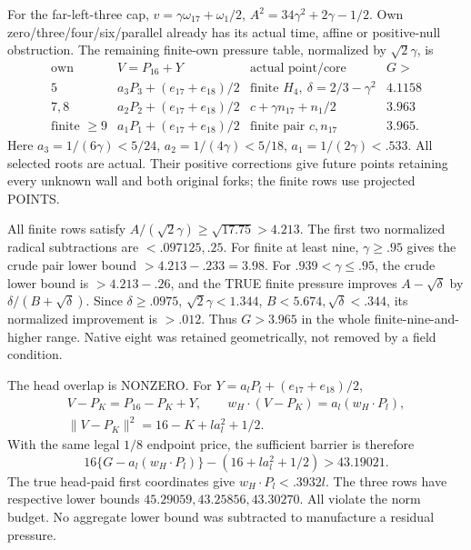\documentclass[11pt]{article}
\theoremstyle{definition}
\theoremstyle{remark}
\begin{document}
For the far-left-three cap,
\(v=\gamma\omega_{17}+\omega_1/2\),
\(A^2=34\gamma^2+2\gamma-1/2\).
Own zero/three/four/six/parallel
already has its actual time,
affine or positive-null
obstruction.
The remaining finite-own
pressure table, normalized by
\(\sqrt2\gamma\), is
\[
\begin{array}{c|c|c|c}
 \text{own}&V=P_{16}+Y&
        \text{actual point/core}&G>\\ \hline
 5&a_3P_3+(e_{17}+e_{18})/2&
       \text{finite }H_4,\ \delta=2/3-\gamma^2&4.1158\\
 7,8&a_2P_2+(e_{17}+e_{18})/2&
       c+\gamma n_{17}+n_1/2&3.963\\
 \text{finite }\ge9&a_1P_1+(e_{17}+e_{18})/2&
       \text{finite pair }c,n_{17}&3.965 .
\end{array}
\]
Here
\(a_3=1/(6\gamma)<5/24\),
\(a_2=1/(4\gamma)<5/18\),
\(a_1=1/(2\gamma)<.533\).
All selected roots are actual.
Their positive corrections give
future points retaining every
unknown wall and both original
forks; the finite rows use
projected POINTS.

All finite rows satisfy
\(A/(\sqrt2\gamma)\ge\sqrt{17.75}>4.213\).
The first two normalized radical
subtractions are \(<.097125,.25\).
For finite at least nine,
\(\gamma\ge.95\) gives the crude
pair lower bound
\(>4.213-.233=3.98\).
For \(.939<\gamma\le.95\),
the crude lower bound is
\(>4.213-.26\), and the TRUE
finite pressure improves
\(A-\sqrt\delta\) by
\(\delta/(B+\sqrt\delta)\).
Since
\(\delta\ge.0975\),
\(\sqrt2\gamma<1.344\),
\(B<5.674,\sqrt\delta<.344\),
its normalized improvement is
\(>.012\).
Thus \(G>3.965\) in the whole
finite-nine-and-higher range.
Native eight was retained
geometrically, not removed by
a field condition.

The head overlap is NONZERO.
For \(Y=a_lP_l+(e_{17}+e_{18})/2\),
\[
 \begin{gathered}
 V-P_K=P_{16}-P_K+Y,\qquad
 w_H\cdot(V-P_K)=a_l(w_H\cdot P_l),\\
       \|V-P_K\|^2=16-K+l a_l^2+1/2 .
 \end{gathered}
\]
With the same legal \(1/8\)
endpoint price, the sufficient
barrier is therefore
\[
             16\{G-a_l(w_H\cdot P_l)\}
                        -(16+l a_l^2+1/2)>43.19021 .
\]
The true head-paid first coordinates
give \(w_H\cdot P_l<.3932l\).
The three rows have respective
lower bounds
\(45.29059,43.25856,43.30270\).
All violate the norm budget.
No aggregate lower bound was
subtracted to manufacture
a residual pressure.
\end{document}

